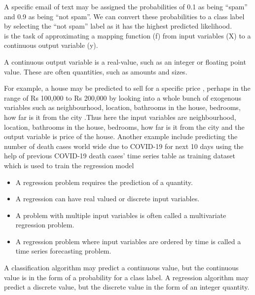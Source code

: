 A specific email of text may be assigned the probabilities of 0.1 as being “spam” and 0.9 as being “not spam”. We can convert these probabilities to a class label by selecting the “not spam” label as it has the highest predicted likelihood. \\

\textcolor{purple}{\underline{}} is the task of approximating a mapping function (f) from input variables (X) to a continuous output variable (y).

A continuous output variable is a real-value, such as an integer or floating point value. These are often quantities, such as amounts and sizes.

For example, a house may be predicted to sell for a specific price , perhaps in the range of  Rs 100,000 to Rs 200,000 by looking into a whole bunch of exogenous variables such as neighbourhood, location, bathrooms in the house, bedrooms, how far is it from the city .Thus here the input variables are neighbourhood, location, bathrooms in the house, bedrooms, how far is it from the city and the output variable is price of the house.  Another example include predicting the number of death cases world wide due to COVID-19 for next 10 days using the help of previous COVID-19 death cases' time series table as training  dataset which is used to train the regression model
\begin{itemize}
    
\item A regression problem requires the prediction of a quantity.
\item A regression can have real valued or discrete input variables.
\item A problem with multiple input variables is often called a multivariate regression problem.
\item A regression problem where input variables are ordered by time is called a time series forecasting problem.
\end{itemize}

A classification algorithm may predict a continuous value, but the continuous value is in the form of a probability for a class label.
A regression algorithm may predict a discrete value, but the discrete value in the form of an integer quantity.
